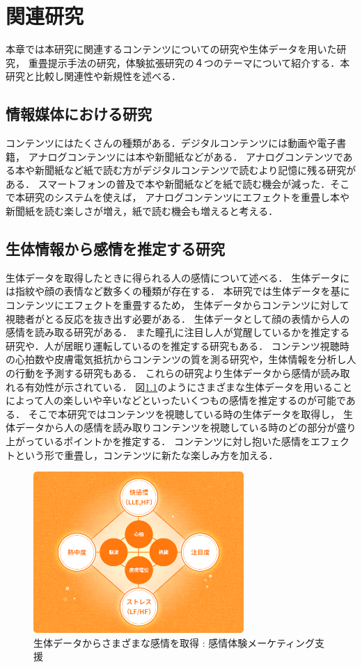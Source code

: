 \thispagestyle{myheadings}
\chapter{関連研究}
本章では本研究に関連するコンテンツについての研究や生体データを用いた研究，
重畳提示手法の研究，体験拡張研究の４つのテーマについて紹介する．本研究と比較し関連性や新規性を述べる．



\section{情報媒体における研究}
コンテンツにはたくさんの種類がある．デジタルコンテンツには動画や電子書籍，
アナログコンテンツには本や新聞紙などがある．
アナログコンテンツである本や新聞紙など紙で読む方がデジタルコンテンツで読むより記憶に残る研究がある\cite{books}．
スマートフォンの普及で本や新聞紙などを紙で読む機会が減った．そこで本研究のシステムを使えば，
アナログコンテンツにエフェクトを重畳し本や新聞紙を読む楽しさが増え，紙で読む機会も増えると考える．

\section{生体情報から感情を推定する研究}

生体データを取得したときに得られる人の感情について述べる．
生体データには指紋や顔の表情など数多くの種類が存在する．
本研究では生体データを基にコンテンツにエフェクトを重畳するため，
生体データからコンテンツに対して視聴者がとる反応を抜き出す必要がある．
生体データとして顔の表情から人の感情を読み取る研究がある\cite{hyoujou,hyoujou2}．
また瞳孔に注目し人が覚醒しているかを推定する研究や．人が居眠り運転しているのを推定する研究もある\cite{doukou}．
コンテンツ視聴時の心拍数や皮膚電気抵抗からコンテンツの質を測る研究\cite{situ}や，生体情報を分析し人の行動を予測する研究\cite{eigo}もある．
これらの研究より生体データから感情が読み取れる有効性が示されている．
図\ref{seitaidata}のようにさまざまな生体データを用いることによって人の楽しいや辛いなどといったいくつもの感情を推定するのが可能である．
そこで本研究ではコンテンツを視聴している時の生体データを取得し，
生体データから人の感情を読み取りコンテンツを視聴している時のどの部分が盛り上がっているポイントかを推定する．
コンテンツに対し抱いた感情をエフェクトという形で重畳し，コンテンツに新たな楽しみ方を加える．

\begin{figure}[H]
    \centering
    \includegraphics[width=8cm]{images/chapter2/heart.png}
    \caption{生体データからさまざまな感情を取得 : 感情体験メーケティング支援}
    \label{seitaidata}
\end{figure}


